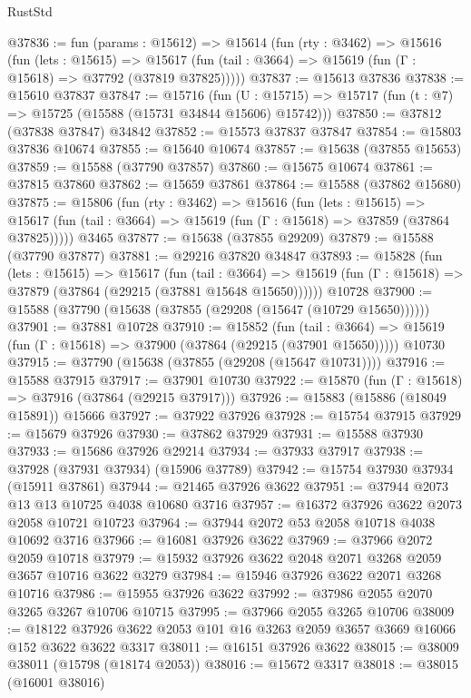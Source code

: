 \begin{lexlean}{RustStd}
\begin{coremodule}
@37836 := fun (params : @15612) =>
  @15614
    (fun (rty : @3462) =>
    @15616
      (fun (lets : @15615) =>
      @15617 (fun (tail : @3664) => @15619 (fun (Γ : @15618) => @37792 (@37819 @37825)))))
@37837 := @15613 @37836
@37838 := @15610 @37837
@37847 := @15716
    (fun (U : @15715) => @15717 (fun (t : @7) => @15725 (@15588 (@15731 @34844 @15606) @15742)))
@37850 := @37812 (@37838 @37847) @34842
@37852 := @15573 @37837 @37847
@37854 := @15803 @37836 @10674
@37855 := @15640 @10674
@37857 := @15638 (@37855 @15653)
@37859 := @15588 (@37790 @37857)
@37860 := @15675 @10674
@37861 := @37815 @37860
@37862 := @15659 @37861
@37864 := @15588 (@37862 @15680)
@37875 := @15806
    (fun (rty : @3462) =>
    @15616
      (fun (lets : @15615) =>
      @15617 (fun (tail : @3664) => @15619 (fun (Γ : @15618) => @37859 (@37864 @37825)))))
    @3465
@37877 := @15638 (@37855 @29209)
@37879 := @15588 (@37790 @37877)
@37881 := @29216 @37820 @34847
@37893 := @15828
    (fun (lets : @15615) =>
    @15617
      (fun (tail : @3664) =>
      @15619 (fun (Γ : @15618) => @37879 (@37864 (@29215 (@37881 @15648 @15650))))))
    @10728
@37900 := @15588 (@37790 (@15638 (@37855 (@29208 (@15647 (@10729 @15650))))))
@37901 := @37881 @10728
@37910 := @15852
    (fun (tail : @3664) => @15619 (fun (Γ : @15618) => @37900 (@37864 (@29215 (@37901 @15650)))))
    @10730
@37915 := @37790 (@15638 (@37855 (@29208 (@15647 @10731))))
@37916 := @15588 @37915
@37917 := @37901 @10730
@37922 := @15870 (fun (Γ : @15618) => @37916 (@37864 (@29215 @37917)))
@37926 := @15883 (@15886 (@18049 @15891)) @15666
@37927 := @37922 @37926
@37928 := @15754 @37915
@37929 := @15679 @37926
@37930 := @37862 @37929
@37931 := @15588 @37930
@37933 := @15686 @37926 @29214
@37934 := @37933 @37917
@37938 := @37928 (@37931 @37934) (@15906 @37789)
@37942 := @15754 @37930 @37934 (@15911 @37861)
@37944 := @21465 @37926 @3622
@37951 := @37944 @2073 @13 @13 @10725 @4038 @10680 @3716
@37957 := @16372 @37926 @3622 @2073 @2058 @10721 @10723
@37964 := @37944 @2072 @53 @2058 @10718 @4038 @10692 @3716
@37966 := @16081 @37926 @3622
@37969 := @37966 @2072 @2059 @10718
@37979 := @15932 @37926 @3622 @2048 @2071 @3268 @2059 @3657 @10716 @3622 @3279
@37984 := @15946 @37926 @3622 @2071 @3268 @10716
@37986 := @15955 @37926 @3622
@37992 := @37986 @2055 @2070 @3265 @3267 @10706 @10715
@37995 := @37966 @2055 @3265 @10706
@38009 := @18122 @37926 @3622 @2053 @101 @16 @3263 @2059 @3657 @3669 @16066 @152 @3622 @3622 @3317
@38011 := @16151 @37926 @3622
@38015 := @38009 @38011 (@15798 (@18174 @2053))
@38016 := @15672 @3317
@38018 := @38015 (@16001 @38016)

\end{coremodule}
\end{lexlean}
